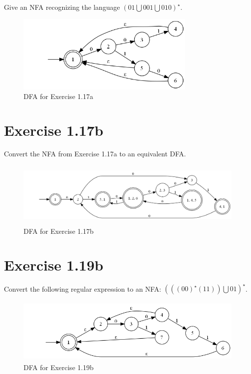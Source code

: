 \documentclass{article}
\newcommand{\union}{\bigcup}
\begin{document}
Give an NFA recognizing the language $(01 \union 001 \union 010)^\star$.

\begin{figure}[h!]
	\centering
	\includegraphics[height=1.5in]{1_17_a.png}
	\caption{DFA for Exercise 1.17a}
\end{figure}

\section{Exercise 1.17b}

Convert the NFA from Exercise 1.17a to an equivalent DFA.

\begin{figure}[h!]
	\centering
	\includegraphics[height=1.25in]{1_17_b.png}
	\caption{DFA for Exercise 1.17b}
\end{figure}

\section{Exercise 1.19b}

Convert the following regular expression to an NFA: $(((00)^\star (11)) \union
01)^\star$.

\begin{figure}[h!]
	\centering
	\includegraphics[height=1.25in]{1_19.png}
	\caption{DFA for Exercise 1.19b}
\end{figure}
\end{document}
